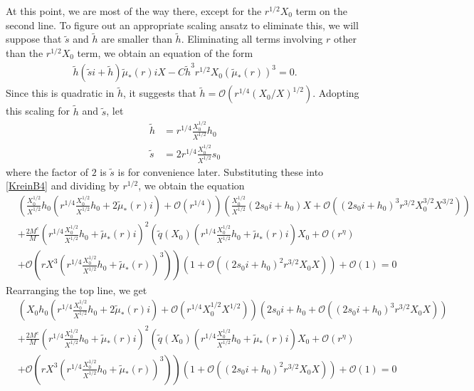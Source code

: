 \documentclass[thesis.tex]{subfiles}
\begin{document}
At this point, we are most of the way there, except for the $r^{1/2}X_0$ term on the second line. To figure out an appropriate scaling ansatz to eliminate this, we will suppose that $\tilde{s}$ and $\tilde{h}$ are smaller than $\tilde{h}$. Eliminating all terms involving $r$ other than the $r^{1/2}X_0$ term, we obtain an equation of the form
\begin{equation*}
\begin{aligned}
\tilde{h} (\tilde{s}i + \tilde{h}) \tilde{\mu}_*(r) i X
- C \tilde{h}^3 r^{1/2} X_0 (\tilde{\mu}_*(r))^3 = 0.
\end{aligned}
\end{equation*} 
Since this is quadratic in $\tilde{h}$, it suggests that $\tilde{h} = \mathcal{O}(r^{1/4}(X_0/X)^{1/2})$. Adopting this scaling for $\tilde{h}$ and $\tilde{s}$, let
\begin{align*}
\tilde{h} &= r^{1/4}\frac{X_0^{1/2}}{X^{1/2}} h_0 \\
\tilde{s} &= 2 r^{1/4}\frac{X_0^{1/2}}{X^{1/2}} s_0
\end{align*}
where the factor of $2$ is $\tilde{s}$ is for convenience later. Substituting these into \cref{KreinB4} and dividing by $r^{1/2}$, we obtain the equation
\begin{equation}\label{KreinB5}
\begin{aligned}
&\left( \frac{X_0^{1/2}}{X^{1/2}} h_0 \left( r^{1/4}\frac{X_0^{1/2}}{X^{1/2}} h_0 + 2 \tilde{\mu}_*(r) i\right) + \mathcal{O}( r^{1/4} ) \right) 
\left( \frac{X_0^{1/2}}{X^{1/2}}(2 s_0 i + h_0) X + \mathcal{O}\left( \left( 2 s_0 i + h_0 \right)^3 r^{3/2} X_0^{3/2} X^{3/2} \right) \right) \\
&+\frac{2 M^c}{M} \left( r^{1/4}\frac{X_0^{1/2}}{X^{1/2}} h_0 + \tilde{\mu}_*(r) i\right)^2 \left( \tilde{q}(X_0) \left(r^{1/4}\frac{X_0^{1/2}}{X^{1/2}} h_0 + \tilde{\mu}_*(r)i \right) X_0 + \mathcal{O}(r^{\eta}) \right.\\
&+ \left. \mathcal{O} \left (r X^3 \left(r^{1/4} \frac{X_0^{1/2}}{X^{1/2}} h_0 + \tilde{\mu}_*(r)\right)^3 \right) \right) \left( 1 + \mathcal{O}\left( \left(2 s_0 i + h_0\right)^2 r^{3/2} X_0 X \right) \right) + \mathcal{O}(1) = 0
\end{aligned}
\end{equation}
Rearranging the top line, we get
\begin{equation*}
\begin{aligned}
&\left( X_0 h_0 \left( r^{1/4}\frac{X_0^{1/2}}{X^{1/2}} h_0 + 2 \tilde{\mu}_*(r) i\right) + \mathcal{O}\left( r^{1/4} X_0^{1/2} X^{1/2} \right) \right) 
\left( 2 s_0 i + h_0 + \mathcal{O}\left( \left( 2 s_0 i + h_0 \right)^3 r^{3/2} X_0 X \right) \right) \\
&+\frac{2 M^c}{M} \left( r^{1/4}\frac{X_0^{1/2}}{X^{1/2}} h_0 + \tilde{\mu}_*(r) i\right)^2 \left( \tilde{q}(X_0) \left(r^{1/4}\frac{X_0^{1/2}}{X^{1/2}} h_0 + \tilde{\mu}_*(r)i \right) X_0 + \mathcal{O}(r^{\eta}) \right.\\
&+ \left. \mathcal{O} \left (r X^3 \left(r^{1/4} \frac{X_0^{1/2}}{X^{1/2}} h_0 + \tilde{\mu}_*(r)\right)^3 \right) \right) \left( 1 + \mathcal{O}\left( \left(2 s_0 i + h_0\right)^2 r^{3/2} X_0 X \right) \right) + \mathcal{O}(1) = 0
\end{aligned}
\end{equation*}
\end{document}
